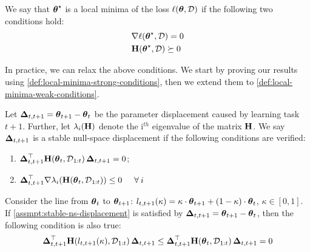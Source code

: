 \documentclass{article} %
\newcommand{\hessian}{\vH}
\begin{document}
\begin{defn}
\label{def:local-minima-strong-conditions}
    We say that $\mbox{$\mbox{$\boldsymbol{\theta}$}$}^\star$ is a local minima of the loss $\ell(\mbox{$\mbox{$\boldsymbol{\theta}$}$}, \mbox{${\cal D}$})$ if the following two conditions hold:
    \begin{align}
    \label{eq:opt-condition2}
    &\nabla\loss(\vparam^\star, \data) = 0\\
    \label{eq:opt-condition3}
    &\hessian(\vparam^\star, \data) \succeq 0
\end{align}
\end{defn}
In practice, we can relax the above conditions. 
We start by proving our results using \cref{def:local-minima-strong-conditions}, then we extend them to \cref{def:local-minima-weak-conditions}. 



\begin{assump}
\label{assmpt:stable-ns-displacement}
    Let $\mbox{$\mbox{$\boldsymbol{\Delta}$}$}_{t,t+1} = \mbox{$\mbox{$\boldsymbol{\theta}$}$}_{t+1} - \mbox{$\mbox{$\boldsymbol{\theta}$}$}_t$ be the parameter displacement caused by learning task $t+1$. Further, let $\lambda_i(\hessian)$ denote the i$^{th}$ eigenvalue of the matrix $\hessian$.  We say $\mbox{$\mbox{$\boldsymbol{\Delta}$}$}_{t,t+1}$ is a stable null-space displacement if the following conditions are verified: 
    \begin{enumerate}
        \item $\vDelta_{t,t+1}^\top \hessian(\vparam_t, \data_{1:t})\,\vDelta_{t,t+1} = 0$;
        \item $\vDelta_{t,t+1}^\top \grad{\lambda_i(\hessian(\vparam_t, \data_{1:t}))} \le 0 \hspace{0.5cm} \forall \:i$
    \end{enumerate}
\end{assump}


\begin{corr}
\label{corr:null-space-preserv.}
    Consider the line from $\mbox{$\mbox{$\boldsymbol{\theta}$}$}_{t}$ to $\mbox{$\mbox{$\boldsymbol{\theta}$}$}_{t+1}$: $l_{t,t+1}(\kappa) = \kappa\cdot \mbox{$\mbox{$\boldsymbol{\theta}$}$}_{t+1} + (1-\kappa)\cdot \mbox{$\mbox{$\boldsymbol{\theta}$}$}_{t}$, $\kappa \in [0,1]$. If \cref{assmpt:stable-ns-displacement} is satisfied by $\mbox{$\mbox{$\boldsymbol{\Delta}$}$}_{t,t+1} = \mbox{$\mbox{$\boldsymbol{\theta}$}$}_{t+1} - \mbox{$\mbox{$\boldsymbol{\theta}$}$}_t$, then the following condition is also true: 
    \begin{align}
        \vDelta_{t,t+1}^\top \hessian(l_{t,t+1}(\kappa), \data_{1:t})\,\vDelta_{t,t+1} \le \vDelta_{t,t+1}^\top \hessian(\vparam_t, \data_{1:t})\,\vDelta_{t,t+1} = 0
    \end{align}
\end{corr}
\end{document}
